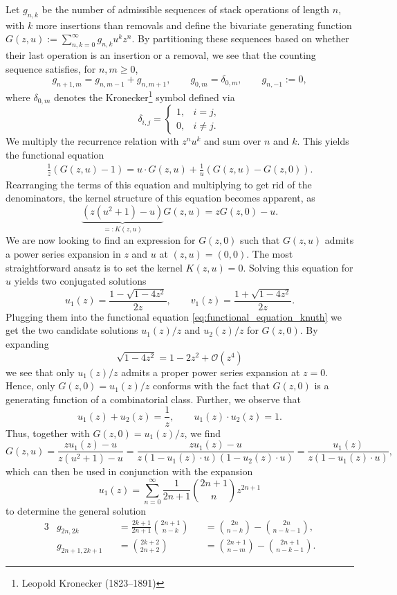 \begin{example}
  Let $g_{n,k}$ be the number of admissible sequences of stack operations of length $n$, with $k$ more insertions than removals and define the bivariate generating function $G(z,u) := \sum_{n, k = 0}^\infty g_{n,k} u^k z^n$.
  By partitioning these sequences based on whether their last operation is an insertion or a removal, we see that the counting sequence satisfies, for $n, m \geq 0$,
  $$
    g_{n+1,m} = g_{n,m-1} + g_{n,m+1}, \qquad g_{0,m} = \delta_{0,m},
    \qquad g_{n,-1} := 0,
  $$
  where $\delta_{0,m}$ denotes the Kronecker\footnote{Leopold Kronecker (1823--1891)} symbol defined via
  $$
    \delta_{i,j} = 
    \begin{cases}
      1, & i = j, \\
      0, & i \neq j.
    \end{cases}
  $$
  We multiply the recurrence relation with $z^n u^k$ and sum over $n$ and $k$. This yields the functional equation
  \begin{align*}
    \frac{1}{z}(G(z,u) - 1) = u \cdot G(z,u) + \frac{1}{u}(G(z,u) - G(z,0)).
  \end{align*}
  Rearranging the terms of this equation and multiplying to get rid of the denominators, the kernel structure of this equation becomes apparent, as
  \begin{equation}\label{eq:functional_equation_knuth}
    \underbrace{(z(u^2 + 1) - u)}_{=: K(z,u)} G(z,u) = zG(z,0) - u.
  \end{equation}
  We are now looking to find an expression for $G(z,0)$ such that $G(z,u)$ admits a power series expansion in $z$ and $u$ at $ (z,u) = (0,0)$. The most straightforward ansatz is to set the kernel $K(z,u) = 0$.
  Solving this equation for $u$ yields two conjugated solutions
  $$
    u_1(z) = \frac{1 - \sqrt{1 - 4z^2}}{2z}, \qquad
    v_1(z) = \frac{1 + \sqrt{1 - 4z^2}}{2z}.
  $$
  Plugging them into the functional equation \eqref{eq:functional_equation_knuth} we get
  the two candidate solutions $u_1(z)/z$ and $u_2(z)/z$ for $G(z,0)$.
  By expanding 
  $$
    \sqrt{1 - 4z^2} = 1 - 2z^2 + \mathcal{O}(z^4)
  $$
  we see that only $u_1(z)/z$ admits a proper power series expansion at $z = 0$. Hence, only $G(z,0) = u_1(z)/z$ conforms with the fact that $G(z,0)$ is a generating function of a combinatorial class. 
  Further, we observe that
  $$
    u_1(z) + u_2(z) = \frac{1}{z}, \qquad u_1(z) \cdot u_2(z) = 1.
  $$
  Thus, together with $G(z,0) = u_1(z)/z$, we find
  $$
    G(z,u) = \frac{zu_1(z) - u}{z(u^2 + 1) - u}
    = \frac{zu_1(z) - u}{z(1 - u_1(z) \cdot u)(1 - u_2(z) \cdot u)} = \frac{u_1(z)}{z(1 - u_1(z) \cdot u)},
  $$
  which can then be used in conjunction with the expansion
  $$
    u_1(z) = \sum_{n = 0}^\infty \frac{1}{2n + 1}\binom{2n + 1}{n}z^{2n+1}
  $$
  to determine the general solution
  \begin{alignat*}{3}
    &g_{2n,2k} &&= \frac{2k + 1}{2n + 1}\binom{2n + 1}{n - k} 
    &&= \binom{2n}{n - k} - \binom{2n}{n - k - 1}, \\
    &g_{2n + 1, 2k + 1} &&= \binom{2k + 2}{2n + 2}
    &&= \binom{2n + 1}{n - m} - \binom{2n + 1}{n - k - 1}. \tag*{\qedhere}
  \end{alignat*}
\end{example}

